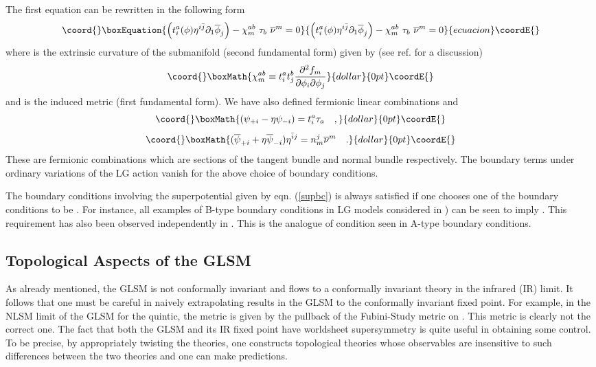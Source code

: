 \documentclass[a4paper,12pt]{article}
\begin{document}
The first equation can be  rewritten in the following  form
\begin{equation}\coord{}\boxEquation{
 \left(t^a_i(\phi) \eta^{i\bar{j}}\partial_1\overline{\phi}_j\right)
- \chi^{ab}_m\ \tau_b\ \overline{\nu}^m =0
}{
 \left(t^a_i(\phi) \eta^{i\bar{j}}\partial_1\overline{\phi}_j\right)
- \chi^{ab}_m\ \tau_b\ \overline{\nu}^m =0
}{ecuacion}\coordE{}\end{equation}
where \coordHE{} is the extrinsic curvature of the submanifold
(second fundamental form) given by (see ref. \cite{candelas} for
a discussion)
$$\coord{}\boxMath{
\chi^{ab}_m \equiv t^a_i t^b_j{{\partial^2 f_m}\over{\partial\phi_i
\partial\phi_j}}
}{dollar}{0pt}\coordE{}$$
and \coordHE{}
is the induced metric (first fundamental form). 
We have also defined fermionic linear combinations \coordHE{} and \coordHE{}  $$\coord{}\boxMath{
({\psi}_{+i} -\eta {\psi}_{-i})=t_i^a \tau_a\quad,}{dollar}{0pt}\coordE{}$$ 
$$\coord{}\boxMath{(\overline{\psi}_{+i} +\eta \overline{\psi}_{-i})\eta^{\bar{i}j}=
n_m^j\overline{\nu}^m\quad.}{dollar}{0pt}\coordE{}$$
These are fermionic combinations
which are sections of the tangent bundle and normal bundle
respectively. The boundary terms under ordinary variations of the LG
action vanish for the above choice of boundary conditions.

The boundary conditions involving the superpotential given by eqn.
(\ref{supbc}) is always satisfied if one chooses one of the boundary
conditions to be \coordHE{}. For instance, all examples of B-type
boundary conditions in LG models considered
in \cite{stt}) can be seen to imply \coordHE{}. This requirement has also
been observed independently  in \cite{HIV}. This is the analogue
of \coordHE{} condition seen in A-type boundary conditions.


\subsection{Topological Aspects of the GLSM}

As already mentioned, the GLSM is not conformally invariant and
flows to a conformally invariant theory in the infrared (IR) 
limit\cite{wittenphases}. It follows that one must be careful in
naively extrapolating results in the GLSM to the conformally
invariant fixed point. For example, in the NLSM limit of the GLSM
for the quintic, the metric is given by the pullback of
the Fubini-Study metric on \coordHE{}. This metric is clearly not the 
correct one.  The fact that both the GLSM and its IR fixed
point have worldsheet \coordHE{} supersymmetry is quite useful
in obtaining some control. To be precise, by appropriately twisting the
theories, one constructs topological theories whose observables are
insensitive to such differences between the two theories and one
can make predictions.
\end{document}
